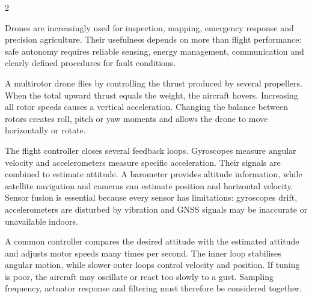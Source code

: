 

\begin{multicols}{2}
\begin{engineeringnews}
Drones are increasingly used for inspection, mapping, emergency response and precision agriculture.
Their usefulness depends on more than flight performance: safe autonomy requires reliable sensing,
energy management, communication and clearly defined procedures for fault conditions.
\end{engineeringnews}

\begin{ecarticle}
A multirotor drone flies by controlling the thrust produced by several propellers. When the total
upward thrust equals the weight, the aircraft hovers. Increasing all rotor speeds causes a vertical
acceleration. Changing the balance between rotors creates roll, pitch or yaw moments and allows the
drone to move horizontally or rotate.

The flight controller closes several feedback loops. Gyroscopes measure angular velocity and
accelerometers measure specific acceleration. Their signals are combined to estimate attitude. A
barometer provides altitude information, while satellite navigation and cameras can estimate
position and horizontal velocity. Sensor fusion is essential because every sensor has limitations:
gyroscopes drift, accelerometers are disturbed by vibration and GNSS signals may be inaccurate or
unavailable indoors.

A common controller compares the desired attitude with the estimated attitude and adjusts motor
speeds many times per second. The inner loop stabilises angular motion, while slower outer loops
control velocity and position. If tuning is poor, the aircraft may oscillate or react too slowly to a
gust. Sampling frequency, actuator response and filtering must therefore be considered together.


\end{ecarticle}
\end{multicols}

